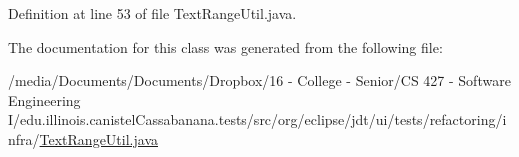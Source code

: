 Definition at line 53 of file TextRangeUtil.java.



The documentation for this class was generated from the following file:\begin{DoxyCompactItemize}
\item 
/media/Documents/Documents/Dropbox/16 -\/ College -\/ Senior/CS 427 -\/ Software Engineering I/edu.illinois.canistelCassabanana.tests/src/org/eclipse/jdt/ui/tests/refactoring/infra/\hyperlink{TextRangeUtil_8java}{TextRangeUtil.java}\end{DoxyCompactItemize}
